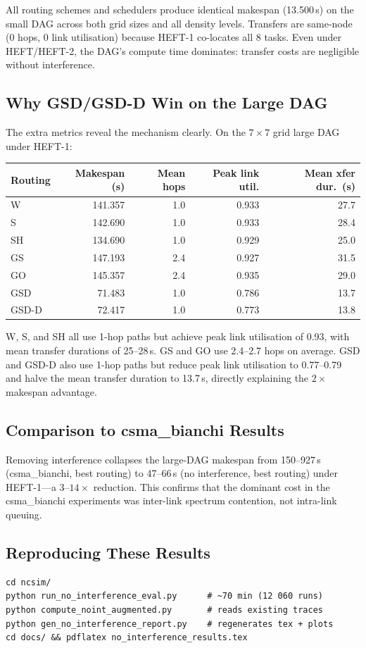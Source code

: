 \documentclass[11pt]{article}
\begin{document}
All routing schemes and schedulers produce identical makespan (13.500\,s) on the small DAG across both grid sizes and all density levels. Transfers are same-node (0 hops, 0 link utilisation) because HEFT-1 co-locates all 8 tasks. Even under HEFT/HEFT-2, the DAG's compute time dominates: transfer costs are negligible without interference.

\subsection{Why GSD/GSD-D Win on the Large DAG}

The extra metrics reveal the mechanism clearly. On the $7\times7$ grid large DAG under HEFT-1:

\begin{center}\small
\begin{tabular}{l r r r r}\toprule
\textbf{Routing} & \textbf{Makespan (s)} & \textbf{Mean hops} & \textbf{Peak link util.} & \textbf{Mean xfer dur.\ (s)} \\\midrule
  W & 141.357 & 1.0 & 0.933 & 27.7 \\
  S & 142.690 & 1.0 & 0.933 & 28.4 \\
  SH & 134.690 & 1.0 & 0.929 & 25.0 \\
  GS & 147.193 & 2.4 & 0.927 & 31.5 \\
  GO & 145.357 & 2.4 & 0.935 & 29.0 \\
  GSD & 71.483 & 1.0 & 0.786 & 13.7 \\
  GSD-D & 72.417 & 1.0 & 0.773 & 13.8 \\
\bottomrule\end{tabular}
\end{center}

W, S, and SH all use 1-hop paths but achieve peak link utilisation of 0.93, with mean transfer durations of 25--28\,s. GS and GO use 2.4--2.7 hops on average. GSD and GSD-D also use 1-hop paths but reduce peak link utilisation to 0.77--0.79 and halve the mean transfer duration to 13.7\,s, directly explaining the $2\times$ makespan advantage.

\subsection{Comparison to csma\_bianchi Results}

Removing interference collapses the large-DAG makespan from 150--927\,s (csma\_bianchi, best routing) to 47--66\,s (no interference, best routing) under HEFT-1---a $3$--$14\times$ reduction. This confirms that the dominant cost in the csma\_bianchi experiments was inter-link spectrum contention, not intra-link queuing.

\subsection{Reproducing These Results}
\begin{verbatim}
cd ncsim/
python run_no_interference_eval.py      # ~70 min (12 060 runs)
python compute_noint_augmented.py       # reads existing traces
python gen_no_interference_report.py    # regenerates tex + plots
cd docs/ && pdflatex no_interference_results.tex
\end{verbatim}
\end{document}
